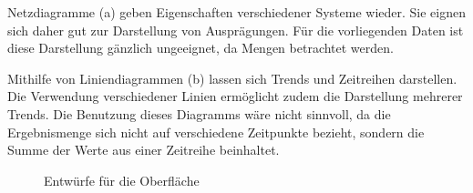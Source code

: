 Netzdiagramme (a) geben Eigenschaften verschiedener Systeme wieder. Sie eignen sich daher gut zur Darstellung von Ausprägungen. Für die vorliegenden Daten ist diese Darstellung gänzlich ungeeignet, da Mengen betrachtet werden. 

Mithilfe von Liniendiagrammen (b) lassen sich Trends und Zeitreihen darstellen. Die Verwendung verschiedener Linien ermöglicht zudem die Darstellung mehrerer Trends. Die Benutzung dieses Diagramms wäre nicht sinnvoll, da die Ergebnismenge sich nicht auf verschiedene Zeitpunkte bezieht, sondern die Summe der Werte aus einer Zeitreihe beinhaltet. 

\begin{figure}[htbp]
\hfill
{}\hfill
{}\hfill
{}
\caption{Entwürfe für die Oberfläche}
\label{konzept_darstellung2}
\end{figure}


